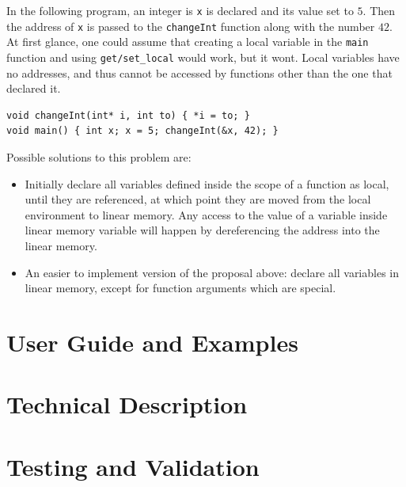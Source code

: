 \documentclass[a4paper]{article}
\begin{document}
In the following program, an integer is \texttt{x} is declared and its value set to $5$. Then the address of \texttt{x} is passed to the \texttt{changeInt} function along with the number $42$. At first glance, one could assume that creating a local variable in the \texttt{main} function and using \texttt{get/set\_local} would work, but it wont. Local variables have no addresses, and thus cannot be accessed by functions other than the one that declared it.
\begin{verbatim}
void changeInt(int* i, int to) { *i = to; }
void main() { int x; x = 5; changeInt(&x, 42); }
\end{verbatim}

Possible solutions to this problem are:
\begin{itemize}
	\item Initially declare all variables defined inside the scope of a function as local, until they are referenced, at which point they are moved from the local environment to linear memory. Any access to the value of a variable inside linear memory variable will happen by dereferencing the address into the linear memory.
	\item An easier to implement version of the proposal above: declare all variables in linear memory, except for function arguments which are special.
\end{itemize}

\section{User Guide and Examples}
\label{sec:user-guide}

\section{Technical Description}
\label{sec:technical}

\section{Testing and Validation}
\label{sec:testing}
\end{document}
